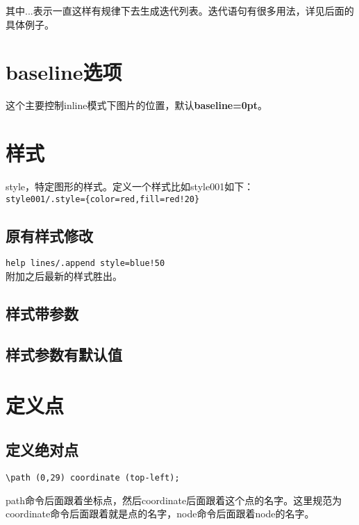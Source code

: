 \documentclass[11pt,oneside]{book}
\begin{document}
\begin{common-format}

其中...表示一直这样有规律下去生成迭代列表。迭代语句有很多用法，详见后面的具体例子。






\section{baseline选项}
这个主要控制inline模式下图片的位置，默认\textbf{baseline=0pt}。

\section{样式}
style，特定图形的样式。定义一个样式比如style001如下：\\
\verb+style001/.style={color=red,fill=red!20}+

\subsection{原有样式修改}
\verb+help lines/.append style=blue!50+\\
附加之后最新的样式胜出。

\subsection{样式带参数}

\subsection{样式参数有默认值}

\section{定义点}
\subsection{定义绝对点}
\begin{Verbatim}
\path (0,29) coordinate (top-left);
\end{Verbatim}
path命令后面跟着坐标点，然后coordinate后面跟着这个点的名字。这里规范为coordinate命令后面跟着就是点的名字，node命令后面跟着node的名字。


\end{common-format}
\end{document}
